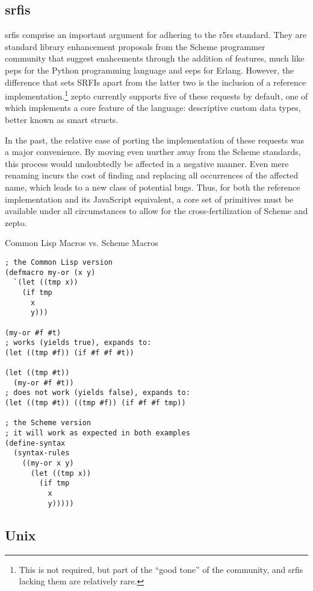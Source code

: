 \documentclass[oneside,11pt,xetex]{scrbook}
\begin{document}
\subsection{\glspl{srfi}}

\glspl{srfi} comprise an important argument for adhering to the \gls{r5rs} standard. They are
standard library enhancement proposals from the Scheme programmer community that suggest
enahcements through the addition of features, much like \glspl{pep} for the Python
programming language and \glspl{eep} for Erlang. However, the difference that sets SRFIs
apart from the latter two is the inclusion of a reference implementation.\footnote{This
is not required, but part of the ``good tone'' of the community, and \gls{srfi}s lacking them
are relatively rare.} zepto currently supports five of these requests by default,
one of which implements a core feature of the language: descriptive custom data types, better
known as smart structs.

In the past, the relative ease of porting the implementation of these requests was a major
convenience. By moving even uurther away from the Scheme standards, this process would
undoubtedly be affected in a negative manner. Even mere renaming incurs the cost of finding
and replacing all occurrences of the affected name, which leads to a new class of potential
bugs. Thus, for both the reference implementation and its
JavaScript equivalent, a core set of primitives must be available under all circumstances
to allow for the cross-fertilization of Scheme and zepto.

\begin{listing}[H]
\caption{Common Lisp Macros vs. Scheme Macros}
\begin{verbatim}
; the Common Lisp version
(defmacro my-or (x y)
  `(let ((tmp x))
    (if tmp
      x
      y)))

(my-or #f #t)
; works (yields true), expands to:
(let ((tmp #f)) (if #f #f #t))

(let ((tmp #t))
  (my-or #f #t))
; does not work (yields false), expands to:
(let ((tmp #t)) ((tmp #f)) (if #f #f tmp))

; the Scheme version
; it will work as expected in both examples
(define-syntax
  (syntax-rules
    ((my-or x y)
      (let ((tmp x))
        (if tmp
          x
          y)))))
\end{verbatim}
\label{fig:schemevscomlisp}
\end{listing}

\subsection{Unix}
\end{document}
